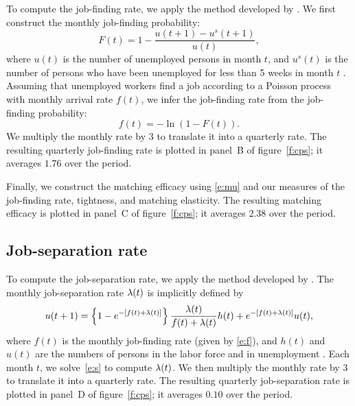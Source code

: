 \documentclass[letterpaper,12pt,leqno]{article}
\begin{document}
To compute the job-finding rate, we apply the method developed by . We first construct the monthly job-finding probability:
\begin{equation}
F(t)=1-\frac{u(t+1)-u^{s}(t+1)}{u(t)},
\label{e:Ft}\end{equation}
where $u(t)$ is the number of unemployed persons in month $t$, and $u^{s}(t)$ is the number of persons who have been unemployed for less than 5 weeks in month $t$ . Assuming that unemployed workers find a job according to a Poisson process with monthly arrival rate $f(t)$, we infer the job-finding rate from the job-finding probability:
\begin{equation}
f(t)=-\ln(1-F(t)).
\label{e:f}\end{equation}
We multiply the monthly rate by 3 to translate it into a quarterly rate. The resulting quarterly job-finding rate is plotted in panel~B of figure~\ref{f:cps}; it averages $1.76$ over the period.

Finally, we construct the matching efficacy using \eqref{e:mu} and our measures of the job-finding rate, tightness, and matching elasticity. The resulting matching efficacy is plotted in panel~C of figure~\ref{f:cps}; it averages $2.38$ over the period.

\subsection{Job-separation rate} 

To compute the job-separation rate, we apply the method developed by . The monthly job-separation rate $\lambda(t)$ is implicitly defined by
\begin{equation}
u(t+1) = \left\lbrace 1-e^{-[f(t)+\lambda(t)]} \right\rbrace\frac{\lambda(t)}{f(t)+\lambda(t)} h(t) + e^{-[f(t)+\lambda(t)]} u(t),
\label{e:s}\end{equation}
where $f(t)$ is the monthly job-finding rate (given by \eqref{e:f}), and $h(t)$ and $u(t)$ are the numbers of persons in the labor force and in unemployment . Each month $t$, we solve~\eqref{e:s} to compute $\lambda(t)$. We then multiply the monthly rate by 3 to translate it into a quarterly rate. The resulting quarterly job-separation rate is plotted in panel~D of figure~\ref{f:cps}; it averages $0.10$ over the period.
\end{document}
